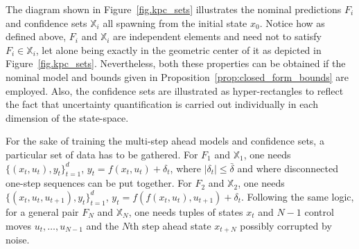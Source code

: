 
The diagram shown in Figure~\ref{fig.kpc_sets} illustrates the nominal predictions $F_i$ and confidence sets $\mathbb{X}_i$ all spawning from the initial state $x_0$. Notice how as defined above, $F_i$ and $\mathbb{X}_i$ are independent elements and need not to satisfy $F_i \in \mathbb{X}_i$, let alone being exactly in the geometric center of it as depicted in Figure~\ref{fig.kpc_sets}. Nevertheless, both these properties can be obtained if the nominal model and bounds given in Proposition~\ref{prop:closed_form_bounds} are employed. Also, the confidence sets are illustrated as hyper-rectangles to reflect the fact that uncertainty quantification is carried out individually in each dimension of the state-space.

For the sake of training the multi-step ahead models and confidence sets, a particular set of data has to be gathered. For $F_1$ and $\mathbb{X}_1$, one needs $\{(x_t,u_t),y_t\}_{t=1}^d$, $y_t = f(x_t,u_t) + \delta_t$, where $|\delta_t| \leq \bar\delta$ and where disconnected one-step sequences can be put together. For $F_2$ and $\mathbb{X}_2$, one needs $\{(x_t,u_t,u_{t+1}),y_t\}_{t=1}^d$, $y_t = f(f(x_t,u_t),u_{t+1}) + \delta_t$. Following the same logic, for a general pair $F_N$ and $\mathbb{X}_N$, one needs tuples of states $x_t$ and $N-1$ control moves $u_t,\dots,u_{N-1}$ and the $N$th step ahead state $x_{t+N}$ possibly corrupted by noise. 

